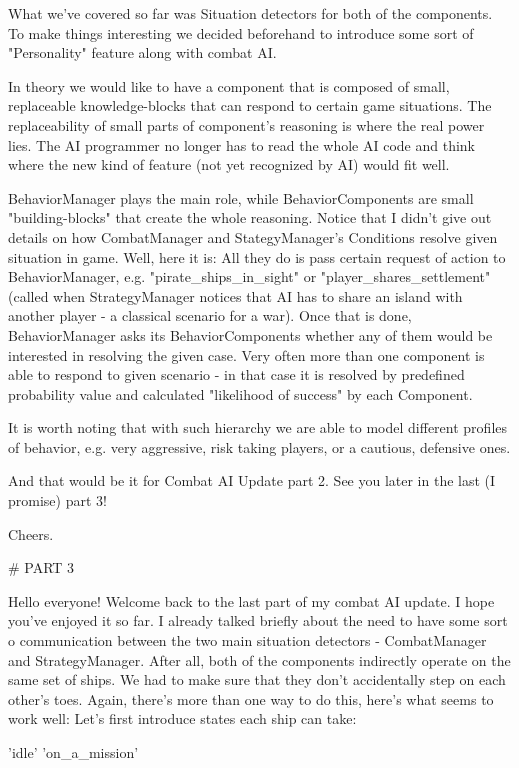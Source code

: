 What we've covered so far was Situation detectors for both of the components.
To make things interesting we decided beforehand to introduce some sort of "Personality" feature along with combat AI.

In theory we would like to have a component that is composed of small, replaceable knowledge-blocks that can respond to certain game situations.
The replaceability of small parts of component's reasoning is where the real power lies.
The AI programmer no longer has to read the whole AI code and think where the new kind of feature (not yet recognized by AI) would fit well.

BehaviorManager plays the main role, while BehaviorComponents are small "building-blocks" that create the whole reasoning.
Notice that I didn't give out details on how CombatManager and StategyManager's Conditions resolve given situation in game.
Well, here it is: All they do is pass certain request of action to BehaviorManager, e.g. "pirate_ships_in_sight" or "player_shares_settlement" (called when StrategyManager notices that AI has to share an island with another player - a classical scenario for a war).
Once that is done, BehaviorManager asks its BehaviorComponents whether any of them would be interested in resolving the given case.
Very often more than one component is able to respond to given scenario - in that case it is resolved by predefined probability value and calculated "likelihood of success" by each Component.

It is worth noting that with such hierarchy we are able to model different profiles of behavior, e.g. very aggressive, risk taking players, or a cautious, defensive ones.

And that would be it for Combat AI Update part 2.
See you later in the last (I promise) part 3!

Cheers.

# PART 3

Hello everyone!
Welcome back to the last part of my combat AI update. I hope you've enjoyed it so far.
I already talked briefly about the need to have some sort o communication between the two main situation detectors - CombatManager and StrategyManager.
After all, both of the components indirectly operate on the same set of ships.
We had to make sure that they don't accidentally step on each other's toes.
Again, there's more than one way to do this, here's what seems to work well:
Let's first introduce states each ship can take:

    'idle'
    'on_a_mission'

